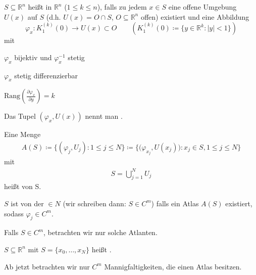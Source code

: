 \begin{theorem}[Definition] \label{thm:9.1}
  \begin{enum-arab}
    \item $S \subseteq \mathbb{R}^n$ heißt  in $\mathbb{R}^n$ ($1 \leq k \leq n$), falls zu jedem $x \in S$ eine offene Umgebung $U(x)$ auf $S$ (d.h. $U(x) = O \cap S$, $O \subseteq \mathbb{R}^n$ offen) existiert und eine Abbildung \[ \varphi_x : K_1^{(k)}(0) \to U(x) \subset O \qquad \left( K_1^{(k)}(0) \coloneq \{ y \in \mathbb{R}^k : |y| < 1 \} \right) \] mit
    \begin{enum-alph}
      \item $\varphi_x$ bijektiv und $\varphi_x^{-1}$ stetig
      \item $\varphi_x$ stetig differenzierbar
      \item $\mathrm{Rang}(\tfrac{\partial \varphi_x}{\partial y}) = k$
    \end{enum-alph}
    Das Tupel $(\varphi_x,U(x))$ nennt man .
    
    \item Eine Menge
    \begin{align*}
      A(S) \coloneq \big\{ (\varphi_j,U_j) : 1 \leq j \leq N \big\} 
      \coloneq \Big\{ \big(\varphi_{x_j},U(x_j)\big) : x_j \in S, 1 \leq j \leq N \Big\}
    \end{align*}
    mit
    \begin{align*}
      S = \bigcup\limits_{j=1}^{N} U_j
    \end{align*}
    heißt  von S.
    
    \item $S$ ist von der  $\in N$ (wir schreiben dann: $S \in C^m$) falls ein Atlas $A(S)$ existiert, sodass $\varphi_j \in C^m$.
    
      Falls $S \in C^m$, betrachten wir nur solche Atlanten.

    \item $S \subseteq \mathbb{R}^n$ mit $S = \{ x_0,\ldots,x_N \}$ heißt  .
  \end{enum-arab}
\end{theorem}

\begin{theorem}[Vereinbarung] \label{thm:9.2}
  Ab jetzt betrachten wir nur $C^m$ Mannigfaltigkeiten, die einen Atlas besitzen.
\end{theorem}

